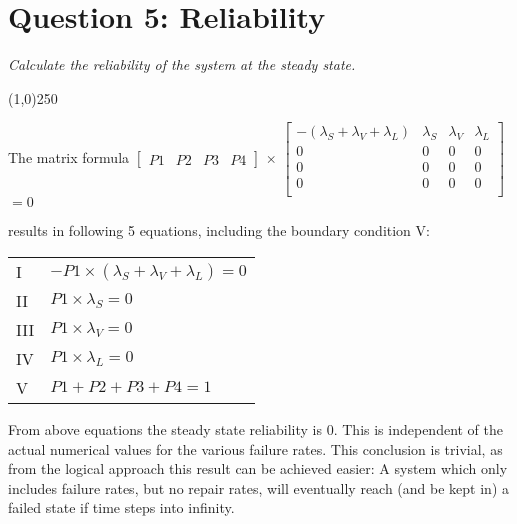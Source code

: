 \section{Question 5: Reliability}
\textit{Calculate the reliability of the system at the steady state.}
\begin{center}
\line(1,0){250}
\end{center}
The matrix formula
$\begin{bmatrix}
P1 & P2 & P3 & P4
\end{bmatrix}$
$\times$
$\begin{bmatrix}
 -(\lambda_S+\lambda_V+\lambda_L) & \lambda_S & \lambda_V & \lambda_L\\
 0 & 0 & 0 & 0\\
 0 & 0 & 0 & 0\\
 0 & 0 & 0 & 0\\
 \end{bmatrix}$
 $= 0$
 
results in following 5 equations, including the boundary condition V:


\begin{table}[!ht]
\centering
\label{tab:equations}
\begin{tabular}{ll}
I   & $-P1\times(\lambda_S+\lambda_V+\lambda_L) = 0$ \\
II  & $P1\times\lambda_S = 0$ \\
III & $P1\times\lambda_V = 0$ \\
IV  & $P1\times\lambda_L = 0$ \\
V   & $P1+P2+P3+P4 = 1$ 
\end{tabular}
\end{table}

From above equations the steady state reliability is $0$. This is independent of the actual numerical values for the various failure rates. This conclusion is trivial, as from the logical approach this result can be achieved easier: A system which only includes failure rates, but no repair rates, will eventually reach (and be kept in) a failed state if time steps into infinity.